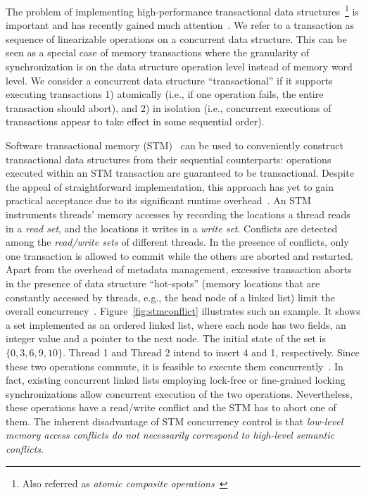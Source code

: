 \documentclass[]{sig-alternate-05-2015}
\begin{document}
The problem of implementing high-performance transactional data structures~\footnote{Also referred as \emph{atomic composite operations}~\cite{golan2013concurrent}} is important and has recently gained much attention~\cite{golan2013concurrent,bronson2010transactional,herlihy2008transactional,gramoli2013composing,golan2015automatic,hassan2014integrating,koskinen2010coarse}. 
We refer to a transaction as sequence of linearizable operations on a concurrent data structure.
This can be seen as a special case of memory transactions where the granularity of synchronization is on the data structure operation level instead of memory word level.
We consider a concurrent data structure ``transactional'' if it supports executing transactions 1) atomically (i.e., if one operation fails, the entire transaction should abort), and 2) in isolation (i.e., concurrent executions of transactions appear to take effect in some sequential order).

Software transactional memory (STM)~\cite{shavit1997software,herlihy2003software} can be used to conveniently construct transactional data structures from their sequential counterparts: operations executed within an STM transaction are guaranteed to be transactional.
Despite the appeal of straightforward implementation, this approach has yet to gain practical acceptance due to its significant runtime overhead~\cite{cascaval2008software}.
An STM instruments threads' memory accesses by recording the locations a thread reads in a \emph{read set}, and the locations it writes in a \emph{write set}. 
Conflicts are detected among the \emph{read/write sets} of different threads. 
In the presence of conflicts, only one transaction is allowed to commit while the others are aborted and restarted.
Apart from the overhead of metadata management, excessive transaction aborts in the presence of data structure ``hot-spots'' (memory locations that are constantly accessed by threads, e.g., the head node of a linked list) limit the overall concurrency~\cite{herlihy2008transactional}.
Figure~\ref{fig:stmconflict} illustrates such an example.
It shows a set implemented as an ordered linked list, where each node has two fields, an integer value and a pointer to the next node.
The initial state of the set is $\{0,3,6,9,10\}$.
Thread 1 and Thread 2 intend to insert 4 and 1, respectively.
Since these two operations commute, it is feasible to execute them concurrently~\cite{clements2015scalable}.
In fact, existing concurrent linked lists employing lock-free or fine-grained locking synchronizations allow concurrent execution of the two operations.
Nevertheless, these operations have a read/write conflict and the STM has to abort one of them. 
The inherent disadvantage of STM concurrency control is that \emph{low-level memory access conflicts do not necessarily correspond to high-level semantic conflicts}.
\end{document}
